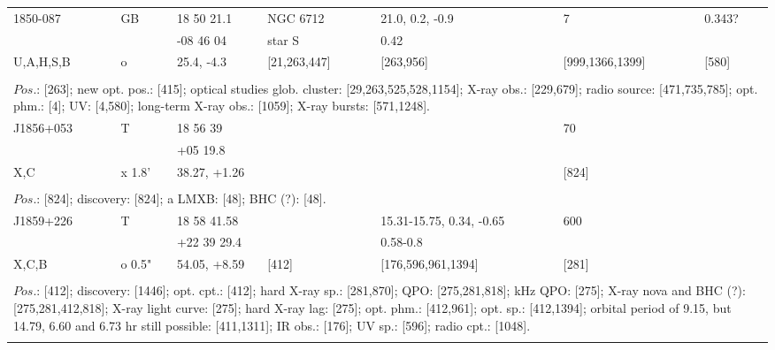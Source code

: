 \documentclass{aa}
\begin{document}
\begin{tabular}{p{2.5cm}p{1cm}p{1.8cm}p{2.3cm}p{3.3cm}p{2.0cm}p{2.2cm}}
\noalign{\smallskip}
1850-087        & GB          & 18 50 21.1            & NGC 6712         & 21.0, 0.2, -0.9      & 7                            & 0.343?             \\
                         &                 & -08 46 04               & star S                & 0.42                      &                                &                       \\
U,A,H,S,B       & o              & 25.4, -4.3               & [21,263,447]      & [263,956]            & [999,1366,1399]  & [580]              \\
\\
\multicolumn{7}{p{17.5cm}}{
$Pos$.: [263]; new opt. pos.: [415]; optical studies glob. cluster: [29,263,525,528,1154]; X-ray obs.: [229,679]; 
radio source: [471,735,785]; opt. phm.: [4]; UV: [4,580]; 
long-term X-ray obs.: [1059]; X-ray bursts: [571,1248].}\\
\noalign{\smallskip}
\hline

\noalign{\smallskip}
J1856+053      & T         & 18 56 39           &                 &                    & 70              &          \\
                          &             & +05 19.8           &                 &                    &                   &          \\
X,C                    & x 1.8'  & 38.27, +1.26    &                 &                    & [824]         &         \\
\\
\multicolumn{7}{p{17.5cm}}{
$Pos$.: [824]; discovery: [824]; a LMXB: [48]; BHC (?): [48].}\\
\noalign{\smallskip}
\hline

\noalign{\smallskip}
J1859+226     & T          & 18 58 41.58    &                         & 15.31-15.75, 0.34, -0.65           & 600                &          \\
                         &              & +22 39 29.4    &                         & 0.58-0.8                                      &                        &    \\
X,C,B              & o 0.5"  & 54.05, +8.59   & [412]               & [176,596,961,1394]                  & [281]              &         \\
\\
\multicolumn{7}{p{17.5cm}}{
$Pos$.: [412]; discovery: [1446]; opt. cpt.: [412]; hard X-ray sp.: [281,870]; QPO: [275,281,818]; 
kHz QPO: [275]; X-ray nova and BHC (?): [275,281,412,818]; X-ray light curve: [275]; hard X-ray lag: [275]; 
opt. phm.: [412,961]; opt. sp.: [412,1394]; orbital period of 9.15, but 14.79, 6.60 and 6.73 hr still possible: 
[411,1311]; IR obs.: [176]; UV sp.: [596]; radio cpt.: [1048].}\\
\noalign{\smallskip}
\hline


\end{tabular}
\end{document}
